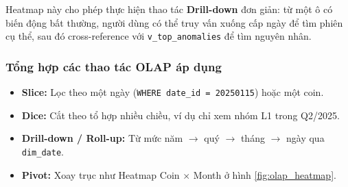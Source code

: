 Heatmap này cho phép thực hiện thao tác \textbf{Drill-down} đơn giản: từ một ô có biến động bất thường, người dùng có thể truy vấn xuống cấp ngày để tìm phiên cụ thể, sau đó cross-reference với \texttt{v\_top\_anomalies} để tìm nguyên nhân.

\subsubsection{Tổng hợp các thao tác OLAP áp dụng}

\begin{itemize}
    \item \textbf{Slice:} Lọc theo một ngày (\texttt{WHERE date\_id = 20250115}) hoặc một coin.
    \item \textbf{Dice:} Cắt theo tổ hợp nhiều chiều, ví dụ chỉ xem nhóm L1 trong Q2/2025.
    \item \textbf{Drill-down / Roll-up:} Từ mức năm $\rightarrow$ quý $\rightarrow$ tháng $\rightarrow$ ngày qua \texttt{dim\_date}.
    \item \textbf{Pivot:} Xoay trục như Heatmap Coin $\times$ Month ở hình \ref{fig:olap_heatmap}.
\end{itemize}
